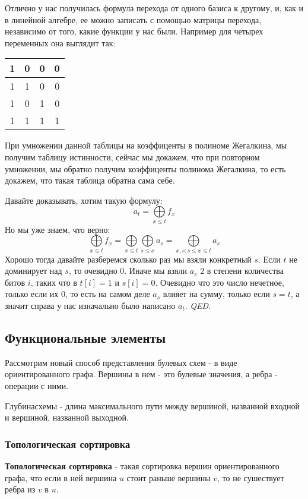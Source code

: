 \documentclass{article}
\begin{document}
Отлично у нас получилась формула перехода от одного базиса к другому, и, как и в линейной алгебре, ее можно записать с помощью матрицы перехода, независимо от того, какие функции у нас были. Например для четырех переменных она выглядит так:

\parbox{\textwidth}{
    \centering
    \begin{tabular}{ |c|c|c|c| }
        \hline
         1 & 0 & 0 & 0 \\
        \hline
         1 & 1 & 0 & 0 \\
        \hline
         1 & 0 & 1 & 0 \\
        \hline
         1 & 1 & 1 & 1 \\
        \hline
    \end{tabular}
}


При умножении данной таблицы на коэффиценты в полиноме Жегалкина, мы получим таблицу истинности, сейчас мы докажем, что при повторном умножении, мы обратно получим коэффиценты полинома Жегалкина, то есть докажем, что такая таблица обратна сама себе.

Давайте доказывать, хотим такую формулу: $$a_t=\bigoplus\limits_{x\leq t}f_x $$ Но мы уже знаем, что верно: $$\bigoplus\limits_{x\leq t}f_x = \bigoplus\limits_{x\leq t}\bigoplus\limits_{s\leq x}a_s=\bigoplus\limits_{x,s : s\leq x \leq t}a_s$$
Хорошо тогда давайте разберемся сколько раз мы взяли конкретный $s$. Если $t$ не доминирует над $s$, то очевидно 0. Иначе мы взяли $a_s$ 2 в степени количества битов $i$, таких что в $t[i]=1$ и $s[i]=0$. Очевидно что это число нечетное, только если их 0, то есть на самом деле $a_s$ влияет на сумму, только если $s=t$, а значит справа у нас изначально было написано $a_t$. \textit{QED}.

\subsection{Функциональные элементы}
Рассмотрим новый способ представления булевых схем - в виде ориентированного графа. Вершины в нем - это булевые значения, а ребра - операции с ними. 

$Глубина схемы$ - длина максимального пути между вершиной, названной входной и вершиной, названной выходной. 

\subsubsection{Топологическая сортировка}
\textbf{Топологическая сортировка} - такая сортировка вершин ориентированного графа, что если в ней вершина $u$ стоит раньше вершины $v$, то не сушествует ребра из $v$ в $u$.
\end{document}
